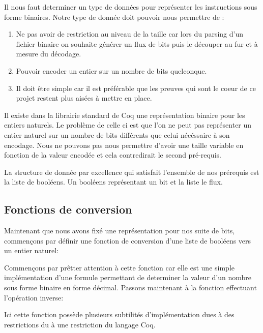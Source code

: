 \documentclass {article}
\newcommand{\codefrom}[3]
           {}
\theoremstyle{definition}
\theoremstyle{remark}
\begin{document}
Il nous faut determiner un type de données pour représenter
les instructions sous forme binaires.
Notre type de donnée doit pouvoir nous permettre de :
\begin{enumerate}
\item Ne pas avoir de restriction au niveau de la taille car lors du parsing d'un fichier binaire
  on souhaite générer un flux de bits puis le découper au fur et à mesure du décodage.
\item Pouvoir encoder un entier sur un nombre de bits quelconque.
\item Il doit être simple car il est préférable que les preuves qui sont le coeur de ce projet restent
  plus aisées à mettre en place.
\end{enumerate}

Il existe dans la librairie standard de Coq une représentation binaire pour les entiers naturels.
Le problème de celle ci est que l'on ne peut pas représenter un entier naturel sur un nombre de bits différents
que celui nécéssaire à son encodage. Nous ne pouvons pas nous permettre d'avoir une taille variable en
fonction de la valeur encodée et cela contredirait le second pré-requis.

La structure de donnée par excellence qui satisfait l'ensemble de nos prérequis est la liste de booléens.
Un booléens représentant un bit et la liste le flux.

\codefrom{src}{ast_instructions}{binary_instruction}




\subsection{Fonctions de conversion}
\label{Fonctions de conversion}
Maintenant que nous avons fixé une représentation pour nos suite de bits, commençons par définir
une fonction de conversion d'une liste de booléens vers un entier naturel:

\codefrom{src}{binary}{bitn}

Commençons par prêtter attention à cette fonction car elle est une simple implémentation
d'une formule permettant de determiner la valeur d'un nombre sous forme binaire
en forme décimal. Passons maintenant à la fonction effectuant l'opération inverse:

\codefrom{src}{binary}{nbit}


Ici cette fonction possède plusieurs subtilités d'implémentation dues à des restrictions du
à une restriction du langage Coq.
\end{document}
